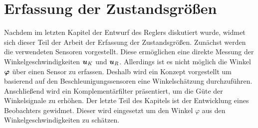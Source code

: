 \ifx\FORMAT\undefined


\fi

\chapter{Erfassung der Zustandsgrößen}\label{chapter_Sensorik}
Nachdem im letzten Kapitel der Entwurf des Reglers diskutiert wurde, widmet sich dieser Teil der Arbeit der Erfassung der Zustandsgrößen. Zunächst werden die verwendeten Sensoren vorgestellt. Diese ermöglichen eine direkte Messung der Winkelgeschwindigkeiten $\boldsymbol{u}_K$ und $\boldsymbol{u}_R$. Allerdings ist es nicht möglich die Winkel $\boldsymbol{\varphi}$ über einen Sensor zu erfassen. Deshalb wird ein Konzept vorgestellt um basierend auf den Beschleunigungssensoren eine Winkelschätzung durchzuführen. Anschließend wird ein Komplementärfilter präsentiert, um die Güte der Winkelsignale zu erhöhen. Der letzte Teil des Kapitels ist der Entwicklung eines Beobachters gewidmet. Dieser wird eingesetzt um den Winkel $\varphi$ aus den Winkelgeschwindigkeiten zu schätzen.
\newpage

\newpage

\newpage

\newpage



\ifx\FORMAT\undefined

\fi
